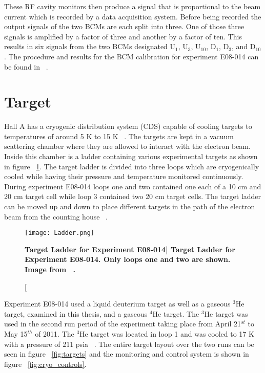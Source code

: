 These RF cavity monitors then produce a signal that is proportional to the beam current which is recorded by a data acquisition system. Before being recorded the output signals of the two BCMs are each split into three. One of those three signals is amplified by a factor of three and another by a factor of ten. This results in six signals from the two BCMs designated U$_1$, U$_3$, U$_{10}$, D$_1$, D$_3$, and D$_{10}$. The procedure and results for the BCM calibration for experiment E08-014 can be found in ~\cite{bcm_calibration}. 

\section{Target}
\label{sec:target}

Hall A has a cryogenic distribution system (CDS) capable of cooling targets to temperatures of around 5 K to 15 K ~\cite{Article:HallA}. The targets are kept in a vacuum scattering chamber where they are allowed to interact with the electron beam. Inside this chamber is a ladder containing various experimental targets as shown in figure ~\ref{fig:ladder}. The target ladder is divided into three loops which are cryogenically cooled while having their pressure and temperature monitored continuously. During experiment E08-014 loops one and two contained one each of a 10 cm and 20 cm target cell while loop 3 contained two 20 cm target cells. The target ladder can be moved up and down to place different targets in the path of the electron beam from the counting house ~\cite{Thesis:Ye}.  

\begin{figure}[!ht]
\begin{center}
\texttt{[image: Ladder.png]}
\end{center}
\caption[\bf{Target Ladder for Experiment E08-014}]{
{\bf{Target Ladder for Experiment E08-014.}} Only loops one and two are shown. Image from ~\cite{Thesis:Ye}.}
\label{fig:ladder}
\end{figure}

Experiment E08-014 used a liquid deuterium target as well as a gaseous $^3$He target, examined in this thesis, and a gaseous $^4$He target. The $^3$He target was used in the second run period of the experiment taking place from April 21$^{st}$ to May 15$^{th}$ of 2011. The $^3$He target was located in loop 1 and was cooled to 17 K with a pressure of 211 psia ~\cite{Thesis:Ye}. The entire target layout over the two runs can be seen in figure ~\ref{fig:targets} and the monitoring and control system is shown in figure ~\ref{fig:cryo_controls}.

